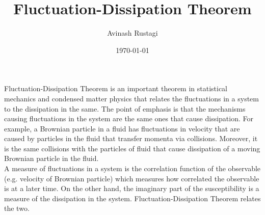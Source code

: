 \documentclass[aps,prb,onecolumn,notitlepage,showpacs,floatfix,superscriptaddress]{revtex4-1}
\begin{document}
\title{Fluctuation-Dissipation Theorem}

\author{Avinash Rustagi}
%
\date{\today}

\maketitle
%
Fluctuation-Dissipation Theorem is an important theorem in statistical mechanics and condensed matter physics that relates the fluctuations in a system to the dissipation in the same. The point of emphasis is that the mechanisms causing fluctuations in the system are the same ones that cause dissipation. For example, a Brownian particle in a fluid has fluctuations in velocity that are caused by particles in the fluid that transfer momenta via collisions. Moreover, it is the same collisions with the particles of fluid that cause dissipation of a moving Brownian particle in the fluid.\\

A measure of fluctuations in a system is the correlation function of the observable (e.g. velocity of Brownian particle) which measures how correlated the observable is at a later time. On the other hand, the imaginary part of the susceptibility is a measure of the dissipation in the system. Fluctuation-Dissipation Theorem relates the two.\\
\end{document}
